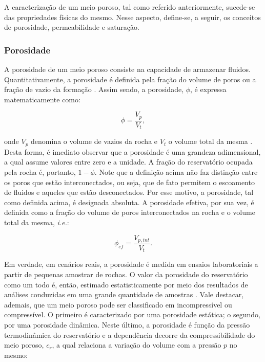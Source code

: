 A caracterização de um meio poroso, tal como referido anteriormente, sucede-se das propriedades físicas do mesmo. Nesse aspecto, define-se, a seguir, os conceitos de porosidade, permeabilidade e saturação. 

\subsubsection{Porosidade}

A porosidade de um meio poroso consiste na capacidade de armazenar fluidos. Quantitativamente, a porosidade é definida pela fração do volume de poros ou a fração de vazio da formação \cite{Ahmed2010,Sousa2023}. Assim sendo, a porosidade, $\phi$, é expressa matematicamente como:

\begin{equation}
	\phi = \frac{V_{p}}{V_{t}},
\end{equation}

onde $V_{p}$ denomina o volume de vazios da rocha e $V_{t}$ o volume total da mesma \cite{Rosa2006}. Desta forma, é imediato observar que a porosidade é uma grandeza adimensional, a qual assume valores entre zero e a unidade. A fração do reservatório ocupada pela rocha é, portanto, $1-\phi$. Note que a definição acima não faz distinção entre os poros que estão interconectados, ou seja, que de fato permitem o escoamento de fluidos e aqueles que estão desconectados. Por esse motivo, a porosidade, tal como definida acima, é designada absoluta. A porosidade efetiva, por sua vez, é definida como a fração do volume de poros interconectados na rocha e o volume total da mesma, \textit{i.e.}:

\begin{equation}
	\phi_{ef} = \frac{V_{p,int}}{V_{t}}.
\end{equation}

Em verdade, em cenários reais, a porosidade é medida em ensaios laboratoriais a partir de pequenas amostrar de rochas. O valor da porosidade do reservatório como um todo é, então, estimado estatisticamente por meio dos resultados de análises conduzidas em uma grande quantidade de amostras \cite{Sousa2023}. Vale destacar, ademais, que um meio poroso pode ser classificado em incompressível ou compressível. O primeiro é caracterizado por uma porosidade estática; o segundo, por uma porosidade dinâmica. Neste último, a porosidade é função da pressão termodinâmica do reservatório e a dependência decorre da compressibilidade do meio poroso, $c_{r}$, a qual relaciona a variação do volume com a pressão $p$ no mesmo:

